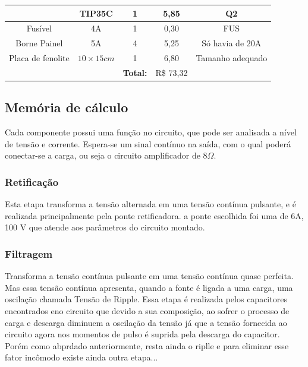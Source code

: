 \documentclass[a4paper,12pt,oneside,openany,table,xcdraw]{article}
\begin{document}
\begin{table}[H]
{\begin{tabular}{cc|c|c|c}
\multicolumn{1}{|c|}{}                              & TIP35C                 & 1                   & 5,85                         & \multicolumn{1}{c|}{Q2}                    \\ \hline
\multicolumn{1}{|c|}{Fusível}                       & 4A                     & 1                   & 0,30                         & \multicolumn{1}{c|}{FUS}                   \\ \hline
\multicolumn{1}{|c|}{Borne Painel}                  & 5A                     & 4                   & 	5,25	  & \multicolumn{1}{c|}{Só havia de 20A}       \\ \hline
\multicolumn{1}{|c|}{Placa de fenolite}             & $10\times 15cm$        & 1                   & 6,80                         & \multicolumn{1}{c|}{Tamanho adequado}      \\ \hline
                                                    &                        & \textbf{Total:}     & R\$ 73,32                    &                                            \\ \cline{3-4}
\end{tabular}%
}
\end{table}

\vspace{0.2cm}
\subsection{Memória de cálculo} %
Cada componente possui uma função no circuito, que pode ser analisada a nível de tensão e corrente. Espera-se um sinal contínuo na saída, com o qual poderá conectar-se a carga, ou seja o circuito amplificador de $8 \Omega$.

\subsubsection{Retificação}
Esta etapa transforma a tensão alternada em uma tensão contínua pulsante, e é realizada principalmente pela ponte retificadora. a ponte escolhida foi uma de 6A, 100 V que atende aos parâmetros do circuito montado.


\subsubsection{Filtragem}
Transforma a tensão contínua pulsante em uma tensão contínua quase perfeita. Mas essa tensão contínua apresenta, quando a fonte é ligada a uma carga, uma oscilação chamada Tensão de Ripple. Essa etapa é realizada pelos capacitores encontrados eno circuito que devido a sua composição, ao sofrer o processo de carga e descarga diminuem a oscilação da tensão já que a tensão fornecida ao circuito agora nos momentos de pulso é suprida pela descarga do capacitor. Porém como abprdado anteriormente, resta ainda o riplle e para eliminar esse fator incômodo existe ainda outra etapa...
\end{document}
